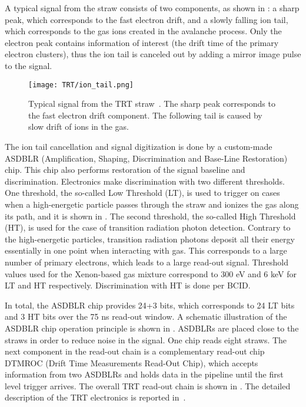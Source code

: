 A typical signal from the straw consists of two components, as shown in : 
a sharp peak, which corresponds to the fast electron drift, and a slowly falling ion tail, which corresponds to the gas ions created in the avalanche process.
Only the electron peak contains information of interest (the drift time of the primary electron clusters), thus the ion tail is canceled out by adding a mirror image pulse to the signal.

\begin{figure}[h]
\centering
\texttt{[image: TRT/ion\_tail.png]}
\caption{ 
 Typical signal from the TRT straw~\cite{ID_TDR_vol2}. The sharp peak corresponds to the fast electron drift component.
 The following tail is caused by slow drift of ions in the gas.
}
\label{fig:ion_tail}
\end{figure}

The ion tail cancellation and signal digitization is done by a custom-made ASDBLR (Amplification, Shaping, Discrimination and Base-Line Restoration) chip. 
This chip also performs restoration of the signal baseline and discrimination. 
Electronics make discrimination with two different thresholds. One threshold, the so-called Low Threshold (LT), 
is used to trigger on cases when a high-energetic particle passes through the straw and ionizes the gas along its path, and it is shown in .
The second threshold, the so-called High Threshold (HT), is used for the case of transition radiation photon detection.
Contrary to the high-energetic particles, transition radiation photons deposit all their energy essentially in one point when interacting with gas.
This corresponds to a large number of primary electrons, which leads to a large read-out signal.
Threshold values used for the Xenon-based gas mixture correspond to 300 eV and 6 keV for LT and HT respectively.
Discrimination with HT is done per BCID. 

In total, the ASDBLR chip provides 24+3 bits, which corresponds to 24 LT bits and 3 HT bits over the 75 ns read-out window.
A schematic illustration of the ASDBLR chip operation principle is shown in .
ASDBLRs are placed close to the straws in order to reduce noise in the signal. One chip reads eight straws.
The next component in the read-out chain is a complementary read-out chip DTMROC (Drift Time Measurements Read-Out Chip), which accepts 
information from two ASDBLRs and holds data in the pipeline until the first level trigger arrives. 
The overall TRT read-out chain is shown in . The detailed description of the TRT electronics is reported in~\cite{TRT_electronics}.

